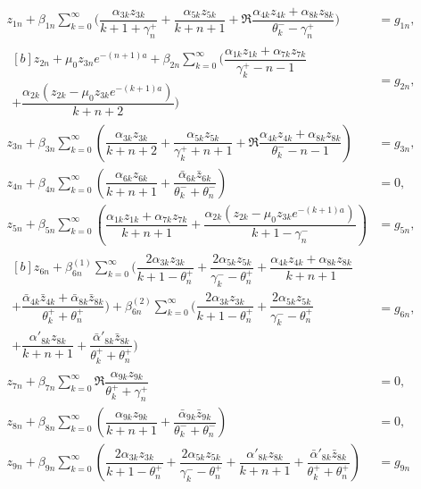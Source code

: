 \begin{equation} \label{Ostryk_Eq_32_} 
\begin{aligned}
	z_{1n} +\beta _{1n} \displaystyle\sum _{k=0}^{\infty }\bigg(\dfrac{\alpha _{3k} z_{3k} }{k+1+\gamma _{n}^{+} } +\dfrac{\alpha _{5k} z_{5k} }{k+n+1} +\Re \dfrac{\alpha _{4k} z_{4k} +\alpha _{8k} z_{8k} }{\theta _{k}^{-} -\gamma _{n}^{+} } \bigg) &=g_{1n} ,
	\\
	\begin{multlined}[b]
		z_{2n} +\mu _{0} z_{3n} e^{-(n+1)a} +\beta _{2n} \sum _{k=0}^{\infty }\bigg(\dfrac{\alpha _{1k} z_{1k} +\alpha _{7k} z_{7k} }{\gamma _{k}^{+} -n-1} 
		\\[-1.2em]
		+\dfrac{\alpha _{2k} (z_{2k} -\mu _{0} z_{3k} e^{-(k+1)a} )}{k+n+2} \bigg) 
	\end{multlined}&=g_{2n} ,
	\\
	z_{3n} +\beta _{3n} \displaystyle\sum _{k=0}^{\infty }\left(\dfrac{\alpha _{3k} z_{3k} }{k+n+2} +\dfrac{\alpha _{5k} z_{5k} }{\gamma _{k}^{+} +n+1} +\Re \dfrac{\alpha _{4k} z_{4k} +\alpha _{8k} z_{8k} }{\theta _{k}^{-} -n-1} \right) &=g_{3n} ,
	\\
	z_{4n} +\beta _{4n} \sum _{k=0}^{\infty }\left(\dfrac{\alpha _{6k} z_{6k} }{k+n+1} +\dfrac{\bar{\alpha }_{6k} \bar{z}_{6k} }{\theta _{k}^{-} +\theta _{n}^{-} } \right)&=0,
	\\
	z_{5n} +\beta _{5n} \displaystyle\sum _{k=0}^{\infty }\left(\dfrac{\alpha _{1k} z_{1k} +\alpha _{7k} z_{7k} }{k+n+1} +\dfrac{\alpha _{2k} (z_{2k} -\mu _{0} z_{3k} e^{-(k+1)a} )}{k+1-\gamma _{n}^{-} } \right) &=g_{5n} ,
	\\
	\begin{multlined}[b]
		z_{6n} +\beta _{6n}^{(1)} \sum _{k=0}^{\infty }\bigg(\dfrac{2\alpha _{3k} z_{3k} }{k+1-\theta _{n}^{+} } +\dfrac{2\alpha _{5k} z_{5k} }{\gamma _{k}^{-} -\theta _{n}^{+} } +\dfrac{\alpha _{4k} z_{4k} +\alpha _{8k} z_{8k} }{k+n+1} 
		\\[-1.2em]
		+\dfrac{\bar{\alpha }_{4k} \bar{z}_{4k} +\bar{\alpha }_{8k} \bar{z}_{8k} }{\theta _{k}^{+} +\theta _{n}^{+} } \bigg) +\beta _{6n}^{(2)} \sum _{k=0}^{\infty }\bigg(\dfrac{2\alpha _{3k} z_{3k} }{k+1-\theta _{n}^{+} } +\dfrac{2\alpha _{5k} z_{5k} }{\gamma _{k}^{-} -\theta _{n}^{+} } 
		\\[-.5em]
		+\dfrac{\alpha '_{8k} z_{8k} }{k+n+1} +\dfrac{\bar{\alpha }'_{8k} \bar{z}_{8k} }{\theta _{k}^{+} +\theta _{n}^{+} } \bigg)
	\end{multlined} &=g_{6n} ,
	\\
	z_{7n} +\beta _{7n} \displaystyle\sum _{k=0}^{\infty }\Re \dfrac{\alpha _{9k} z_{9k} }{\theta _{k}^{+} +\gamma _{n}^{+} }  &=0,
	\\
	z_{8n} +\beta _{8n} \displaystyle\sum _{k=0}^{\infty }\left(\dfrac{\alpha _{9k} z_{9k} }{k+n+1} +\dfrac{\bar{\alpha }_{9k} \bar{z}_{9k} }{\theta _{k}^{-} +\theta _{n}^{-} } \right) &=0,
	\\
	z_{9n} +\beta _{9n} \sum _{k=0}^{\infty }\left(\dfrac{2\alpha _{3k} z_{3k} }{k+1-\theta _{n}^{+} } +\dfrac{2\alpha _{5k} z_{5k} }{\gamma _{k}^{-} -\theta _{n}^{+} } +\dfrac{\alpha '_{8k} z_{8k} }{k+n+1} +\dfrac{\bar{\alpha }'_{8k} \bar{z}_{8k} }{\theta _{k}^{+} +\theta _{n}^{+} } \right)& =g_{9n}   
\end{aligned}
\end{equation} 

